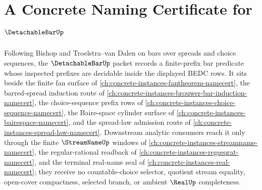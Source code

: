 \chapter{A Concrete Naming Certificate for $\DetachableBarUp$}
\label{ch:concrete-instances-detachable-bar-namecert}

Following Bishop and Troelstra--van Dalen on bars over spreads and choice sequences, the $\DetachableBarUp$ packet records a finite-prefix bar predicate whose inspected prefixes are decidable inside the displayed BEDC rows. It sits beside the finite fan surface of \autoref{ch:concrete-instances-fantheorem-namecert}, the barred-spread induction route of \autoref{ch:concrete-instances-brouwer-bar-induction-namecert}, the choice-sequence prefix rows of \autoref{ch:concrete-instances-choice-sequence-namecert}, the Baire-space cylinder surface of \autoref{ch:concrete-instances-bairespace-namecert}, and the spread-law admission route of \autoref{ch:concrete-instances-spread-law-namecert}. Downstream analytic consumers reach it only through the finite $\StreamNameUp$ windows of \autoref{ch:concrete-instances-streamname-namecert}, the regular-rational readback of \autoref{ch:concrete-instances-regseqrat-namecert}, and the terminal real-name seal of \autoref{ch:concrete-instances-real-namecert}; they receive no countable-choice selector, quotient stream equality, open-cover compactness, selected branch, or ambient $\RealUp$ completeness.


